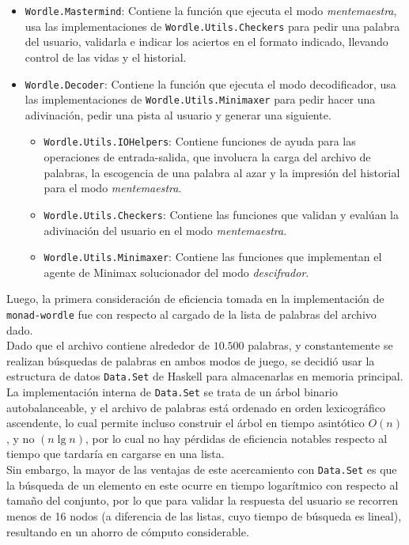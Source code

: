 \documentclass[11pt]{article}
\begin{document}
\begin{itemize}
   \item \texttt{Wordle.Mastermind}: Contiene la función que ejecuta el modo \emph{mentemaestra}, usa las implementaciones de \texttt{Wordle.Utils.Checkers} para pedir una palabra del usuario, validarla e indicar los aciertos en el formato indicado, llevando control de las vidas y el historial.
   \item \texttt{Wordle.Decoder}: Contiene la función que ejecuta el modo decodificador, usa las implementaciones de \texttt{Wordle.Utils.Minimaxer} para pedir hacer una adivinación, pedir una pista al usuario y generar una siguiente.
   \begin{itemize}
      \item \texttt{Wordle.Utils.IOHelpers}: Contiene funciones de ayuda para las operaciones de entrada-salida, que involucra la carga del archivo de palabras, la escogencia de una palabra al azar y la impresión del historial para el modo \emph{mentemaestra}.
      \item \texttt{Wordle.Utils.Checkers}: Contiene las funciones que validan y evalúan la adivinación del usuario en el modo \emph{mentemaestra}.
      \item \texttt{Wordle.Utils.Minimaxer}: Contiene las funciones que implementan el agente de Minimax solucionador del modo \emph{descifrador}.
   \end{itemize}
\end{itemize}

Luego, la primera consideración de eficiencia tomada en la implementación de \texttt{monad-wordle} fue con respecto al cargado de la lista de palabras del archivo dado. \\

Dado que el archivo contiene alrededor de $10.500$ palabras, y constantemente se realizan búsquedas de palabras en ambos modos de juego, se decidió usar la estructura de datos \texttt{Data.Set} de Haskell para almacenarlas en memoria principal. La implementación interna de \texttt{Data.Set} se trata de un árbol binario autobalanceable, y el archivo de palabras está ordenado en orden lexicográfico ascendente, lo cual permite incluso construir el árbol en tiempo asintótico $O(n)$, y no $(n\lg n)$, por lo cual no hay pérdidas de eficiencia notables respecto al tiempo que tardaría en cargarse en una lista. \\

Sin embargo, la mayor de las ventajas de este acercamiento con \texttt{Data.Set} es que la búsqueda de un elemento en este ocurre en tiempo logarítmico con respecto al tamaño del conjunto, por lo que para validar la respuesta del usuario se recorren menos de 16 nodos (a diferencia de las listas, cuyo tiempo de búsqueda es lineal), resultando en un ahorro de cómputo considerable.
\end{document}
